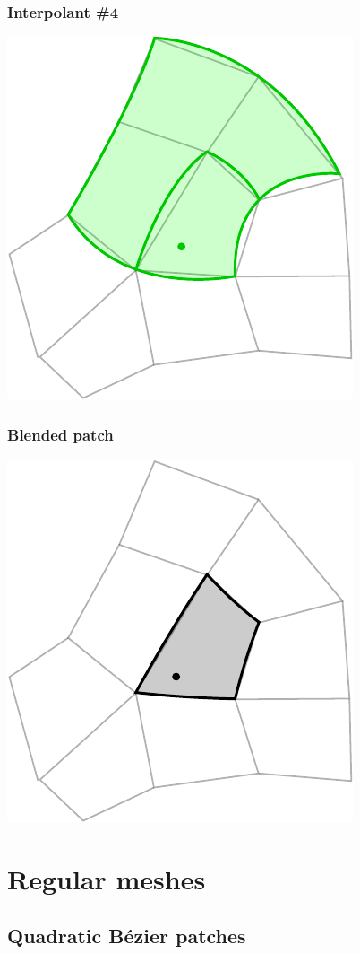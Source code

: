 \documentclass{beamer}
\begin{document}
\begin{frame}
  \frametitle{Interpolant \#4}
  \centering
  \includegraphics[width=.6\textwidth]{images/blend4.pdf}
\end{frame}

\begin{frame}
  \frametitle{Blended patch}
  \centering
  \includegraphics[width=.6\textwidth]{images/blend5.pdf}
\end{frame}


\section{Regular meshes}

\subsection{Quadratic B\'ezier patches}
\end{document}
